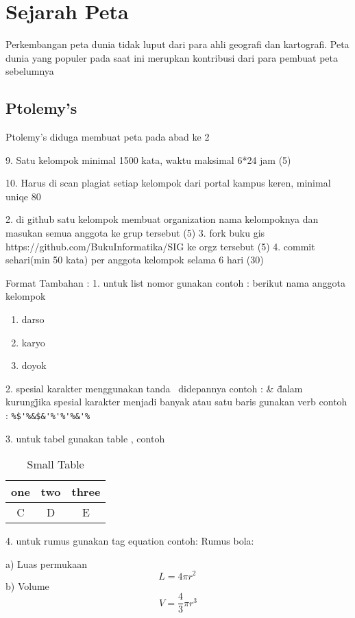 			\section{Sejarah Peta}
			Perkembangan peta dunia tidak luput dari para ahli geografi dan kartografi. Peta dunia yang populer pada saat ini merupkan kontribusi dari para 
			pembuat peta sebelumnya

			\subsection{Ptolemy's}
			Ptolemy's diduga membuat peta pada abad ke 2
	
		9. Satu kelompok minimal 1500 kata, waktu maksimal 6*24 jam (5)

		10. Harus di scan plagiat setiap kelompok dari portal kampus keren, minimal uniqe 80%






2. di github satu kelompok membuat organization nama kelompoknya dan masukan semua anggota ke grup tersebut (5)
3. fork buku gis https://github.com/BukuInformatika/SIG ke orgz tersebut (5)
4. commit sehari(min 50 kata) per anggota kelompok selama 6 hari (30)




Format Tambahan :
1. untuk list nomor gunakan
	contoh :
	berikut nama anggota kelompok
\begin{enumerate}
	\item darso
	\item karyo
	\item doyok
\end{enumerate}

2. spesial karakter menggunakan tanda \ didepannya
	contoh :
	\&
	\"dalam kurung\"
	jika spesial karakter menjadi banyak atau satu baris gunakan verb
	contoh :
	\verb|%$'%&$&'%'%'%&'%|
	
3. untuk tabel gunakan table , contoh

\begin{table}[h]
\caption{Small Table}
\centering
\begin{tabular}{ccc}
\hline
one&two&three\\
\hline
C&D&E\\
\hline
\end{tabular}
\end{table}

4. untuk rumus gunakan tag equation
	contoh:
	Rumus bola:

	a) Luas permukaan
	 \begin{equation}
	     L = 4 \pi r^2 \,
	\end{equation}
	b) Volume
	 \begin{equation}
	     V = \frac{4}{3}\pi r^3
	\end{equation}